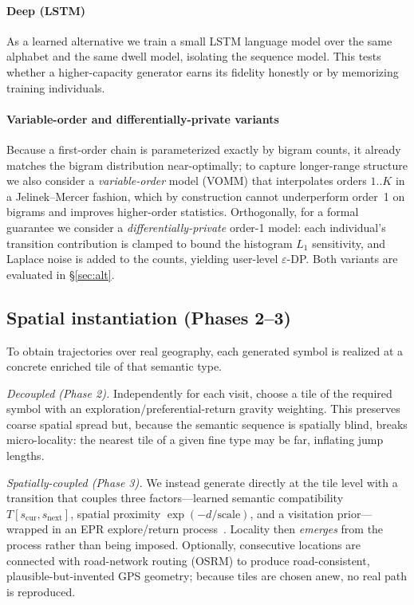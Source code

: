 \documentclass[sigconf,nonacm]{acmart}
\begin{document}
\paragraph{Deep (LSTM)}
As a learned alternative we train a small LSTM language model over the same alphabet and the same
dwell model, isolating the sequence model. This tests whether a higher-capacity generator earns its
fidelity honestly or by memorizing training individuals.

\paragraph{Variable-order and differentially-private variants}
Because a first-order chain is parameterized exactly by bigram counts, it already matches the bigram
distribution near-optimally; to capture longer-range structure we also consider a \emph{variable-order}
model (VOMM) that interpolates orders $1..K$ in a Jelinek--Mercer fashion, which by construction cannot
underperform order~1 on bigrams and improves higher-order statistics. Orthogonally, for a formal
guarantee we consider a \emph{differentially-private} order-1 model: each individual's transition
contribution is clamped to bound the histogram $L_1$ sensitivity, and Laplace noise is added to the
counts, yielding user-level $\varepsilon$-DP. Both variants are evaluated in \S\ref{sec:alt}.

\subsection{Spatial instantiation (Phases 2--3)}
To obtain trajectories over real geography, each generated symbol is realized at a concrete enriched
tile of that semantic type.

\emph{Decoupled (Phase 2).} Independently for each visit, choose a tile of the required symbol with an
exploration/preferential-return gravity weighting. This preserves coarse spatial spread but, because
the semantic sequence is spatially blind, breaks micro-locality: the nearest tile of a given fine
type may be far, inflating jump lengths.

\emph{Spatially-coupled (Phase 3).} We instead generate directly at the tile level with a transition
that couples three factors---learned semantic compatibility $T[s_{\text{cur}},s_{\text{next}}]$,
spatial proximity $\exp(-d/\text{scale})$, and a visitation prior---wrapped in an EPR explore/return
process~\cite{song2010}. Locality then \emph{emerges} from the process rather than being imposed.
Optionally, consecutive locations are connected with road-network routing (OSRM) to produce
road-consistent, plausible-but-invented GPS geometry; because tiles are chosen anew, no real path is
reproduced.
\end{document}
